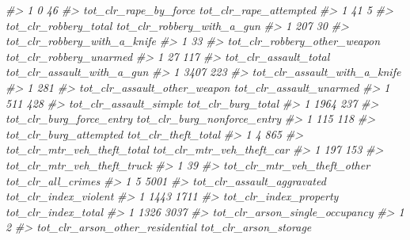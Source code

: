 \documentclass[
]{krantz}
\makeatletter
\newenvironment{Shaded}{\begin{snugshade}}{\end{snugshade}}
\newcommand{\CommentTok}[1]{\textcolor[rgb]{0.37,0.37,0.37}{\textit{#1}}}
\newenvironment{kframe}{%
\medskip{}
\setlength{\fboxsep}{.8em}
 \def\at@end@of@kframe{}%
 \ifinner\ifhmode%
  \def\at@end@of@kframe{\end{minipage}}%
  \begin{minipage}{\columnwidth}%
 \fi\fi%
 \def\FrameCommand##1{\hskip\@totalleftmargin \hskip-\fboxsep
 \colorbox{shadecolor}{##1}\hskip-\fboxsep
     \hskip-\linewidth \hskip-\@totalleftmargin \hskip\columnwidth}%
 \MakeFramed {\advance\hsize-\width
   \@totalleftmargin\z@ \linewidth\hsize
   \@setminipage}}%
 {\par\unskip\endMakeFramed%
 \at@end@of@kframe}
\renewenvironment{Shaded}{\begin{kframe}}{\end{kframe}}
\makeatother
\begin{document}
\begin{Shaded}
\begin{Highlighting}[]
\CommentTok{\#\textgreater{} 1                    0                 46}
\CommentTok{\#\textgreater{}   tot\_clr\_rape\_by\_force tot\_clr\_rape\_attempted}
\CommentTok{\#\textgreater{} 1                    41                      5}
\CommentTok{\#\textgreater{}   tot\_clr\_robbery\_total tot\_clr\_robbery\_with\_a\_gun}
\CommentTok{\#\textgreater{} 1                   207                         30}
\CommentTok{\#\textgreater{}   tot\_clr\_robbery\_with\_a\_knife}
\CommentTok{\#\textgreater{} 1                           33}
\CommentTok{\#\textgreater{}   tot\_clr\_robbery\_other\_weapon tot\_clr\_robbery\_unarmed}
\CommentTok{\#\textgreater{} 1                           27                     117}
\CommentTok{\#\textgreater{}   tot\_clr\_assault\_total tot\_clr\_assault\_with\_a\_gun}
\CommentTok{\#\textgreater{} 1                  3407                        223}
\CommentTok{\#\textgreater{}   tot\_clr\_assault\_with\_a\_knife}
\CommentTok{\#\textgreater{} 1                          281}
\CommentTok{\#\textgreater{}   tot\_clr\_assault\_other\_weapon tot\_clr\_assault\_unarmed}
\CommentTok{\#\textgreater{} 1                          511                     428}
\CommentTok{\#\textgreater{}   tot\_clr\_assault\_simple tot\_clr\_burg\_total}
\CommentTok{\#\textgreater{} 1                   1964                237}
\CommentTok{\#\textgreater{}   tot\_clr\_burg\_force\_entry tot\_clr\_burg\_nonforce\_entry}
\CommentTok{\#\textgreater{} 1                      115                         118}
\CommentTok{\#\textgreater{}   tot\_clr\_burg\_attempted tot\_clr\_theft\_total}
\CommentTok{\#\textgreater{} 1                      4                 865}
\CommentTok{\#\textgreater{}   tot\_clr\_mtr\_veh\_theft\_total tot\_clr\_mtr\_veh\_theft\_car}
\CommentTok{\#\textgreater{} 1                         197                       153}
\CommentTok{\#\textgreater{}   tot\_clr\_mtr\_veh\_theft\_truck}
\CommentTok{\#\textgreater{} 1                          39}
\CommentTok{\#\textgreater{}   tot\_clr\_mtr\_veh\_theft\_other tot\_clr\_all\_crimes}
\CommentTok{\#\textgreater{} 1                           5               5001}
\CommentTok{\#\textgreater{}   tot\_clr\_assault\_aggravated tot\_clr\_index\_violent}
\CommentTok{\#\textgreater{} 1                       1443                  1711}
\CommentTok{\#\textgreater{}   tot\_clr\_index\_property tot\_clr\_index\_total}
\CommentTok{\#\textgreater{} 1                   1326                3037}
\CommentTok{\#\textgreater{}   tot\_clr\_arson\_single\_occupancy}
\CommentTok{\#\textgreater{} 1                              2}
\CommentTok{\#\textgreater{}   tot\_clr\_arson\_other\_residential tot\_clr\_arson\_storage}

\end{Highlighting}
\end{Shaded}
\end{document}

